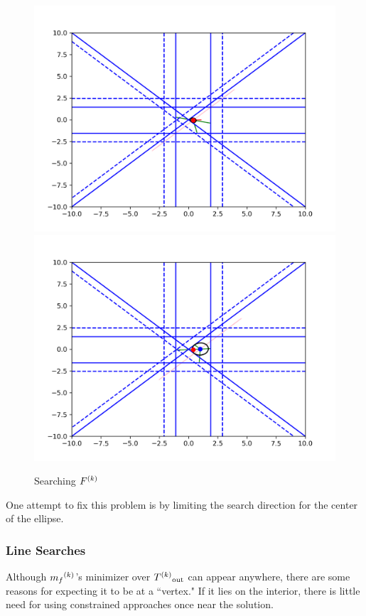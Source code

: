 \begin{figure}[h]
    \centering
    \includegraphics[scale=0.4]{images/everything_runs_1.png}
    \includegraphics[scale=0.4]{images/everything_runs_2.png}
    \caption{Searching ${F}^{(k)}$}
    \label{ellipse_runs_away}
\end{figure}


One attempt to fix this problem is by limiting the search direction for the center of the ellipse.


\subsubsection{Line Searches}
Although ${{m}_f}^{(k)}$'s minimizer over ${T^{(k)}}_{\text{out}}$  can appear anywhere, there are some reasons for expecting it to be at a ``vertex."
If it lies on the interior, there is little need for using constrained approaches once near the solution.

